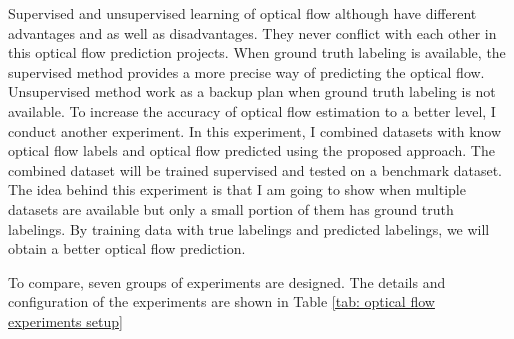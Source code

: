 \documentclass{iitthesis}
\begin{document}
Supervised and unsupervised learning of optical flow although have different advantages and as well as disadvantages. They never conflict with each other in this optical flow prediction projects. When ground truth labeling is available, the supervised method provides a more precise way of predicting the optical flow. Unsupervised method work as a backup plan when ground truth labeling is not available. To increase the accuracy of optical flow estimation to a better level, I conduct another experiment. In this experiment, I combined datasets with know optical flow labels and optical flow predicted using the proposed approach. The combined dataset will be trained supervised and tested on a benchmark dataset.　The idea behind this experiment is that I am going to show when multiple datasets are available but only a small portion of them has ground truth labelings. By training data with true labelings and predicted labelings, we will obtain a better optical flow prediction.

To compare, seven groups of experiments are designed. The details and configuration of the experiments are shown in Table \ref{tab: optical flow experiments setup}
\end{document}
